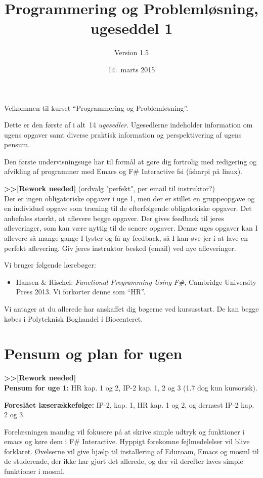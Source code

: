 \documentclass[a4paper,12pt]{article}
\title{Programmering og Problemløsning, ugeseddel 1}
\author{Version 1.5}%
\date{14.\ marts 2015}
\begin{document}
\maketitle{}

Velkommen til kurset ``Programmering og Problemløsning''.

Dette er den første af i alt~14 \emph{ugesedler}. Ugesedlerne
indeholder information om ugens opgaver samt diverse praktisk
information og perspektivering af ugens pensum.

Den første undervisningsuge har til formål at gøre dig fortrolig med
redigering og afvikling af programmer med Emacs og F\# Interactive fsi (fsharpi på linux).

\textbf{>>[Rework needed]} (ordvalg "perfekt", per email til instruktor?)\\
Der er ingen obligatoriske opgaver i uge 1, men der er stillet en
gruppeopgave og en individuel opgave som træning til de efterfølgende obligatoriske opgaver. Det anbefales stærkt, at aflevere begge opgaver. Der gives feedback til jeres afleveringer, som kan være nyttig til de senere opgaver.  Denne uges opgaver kan I aflevere så mange gange I lyster og få ny feedback, så I kan øve jer i at lave en perfekt aflevering.  Giv jeres instruktor besked (email) ved nye afleveringer.

Vi bruger følgende lærebøger:

\begin{itemize}
\item Hansen \& Rischel: \textit{Functional Programming Using F\#},
  Cambridge University Press 2013. Vi forkorter denne som ``HR''.
\end{itemize}

Vi antager at du allerede har anskaffet dig bøgerne ved kursusstart. De kan begge købes i Polyteknisk Boghandel i Biocenteret.


\section{Pensum og plan for ugen}
\label{sec:pensum-og-plan}

\textbf{>>[Rework needed]}\\
\textbf{Pensum for uge 1:} HR kap. 1 og 2, IP-2 kap. 1, 2 og 3 (1.7 dog kun kursorisk).

\textbf{Foreslået læserækkefølge:} IP-2, kap. 1, HR kap. 1 og 2, og dernæst
IP-2 kap. 2 og 3.

Forelæsningen mandag vil fokusere på at skrive simple udtryk og
funktioner i emacs og køre dem i F\# Interactive. Hyppigt forekomne
fejlmedelelser vil blive forklaret. Øvelserne vil give hjælp til
installering af Eduroam, Emacs og mosml til de studerende, der ikke
har gjort det allerede, og der vil derefter laves simple funktioner i
mosml.
\end{document}
